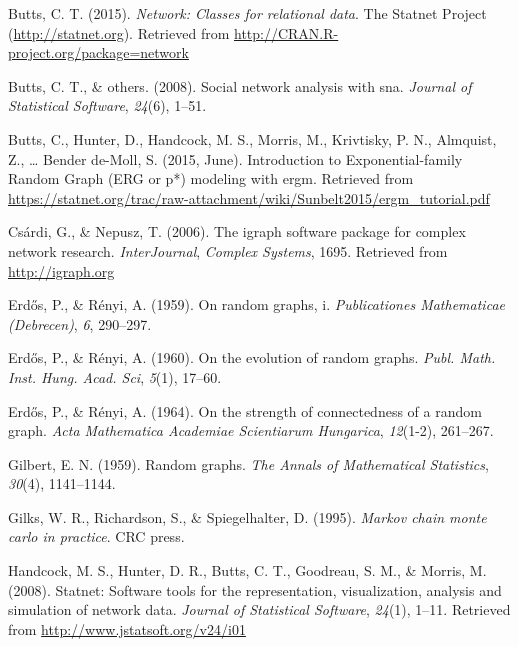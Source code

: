 \documentclass[12pt,twoside]{amherstthesis}
\begin{document}
  \hypertarget{ref-networkpackagemanual}{}
  Butts, C. T. (2015). \emph{Network: Classes for relational data}. The
  Statnet Project (\url{http://statnet.org}). Retrieved from
  \url{http://CRAN.R-project.org/package=network}
  
  \hypertarget{ref-butts2008social}{}
  Butts, C. T., \& others. (2008). Social network analysis with sna.
  \emph{Journal of Statistical Software}, \emph{24}(6), 1--51.
  
  \hypertarget{ref-butts_introduction_2015}{}
  Butts, C., Hunter, D., Handcock, M. S., Morris, M., Krivtisky, P. N.,
  Almquist, Z., \ldots{} Bender de-Moll, S. (2015, June). Introduction to
  Exponential-family Random Graph (ERG or p*) modeling with ergm.
  Retrieved from
  \url{https://statnet.org/trac/raw-attachment/wiki/Sunbelt2015/ergm_tutorial.pdf}
  
  \hypertarget{ref-igraphpackage}{}
  Csárdi, G., \& Nepusz, T. (2006). The igraph software package for
  complex network research. \emph{InterJournal}, \emph{Complex Systems},
  1695. Retrieved from \url{http://igraph.org}
  
  \hypertarget{ref-erdos1959random}{}
  Erd\H{o}s, P., \& Rényi, A. (1959). On random graphs, i.
  \emph{Publicationes Mathematicae (Debrecen)}, \emph{6}, 290--297.
  
  \hypertarget{ref-erdos1960evolution}{}
  Erd\H{o}s, P., \& Rényi, A. (1960). On the evolution of random graphs.
  \emph{Publ. Math. Inst. Hung. Acad. Sci}, \emph{5}(1), 17--60.
  
  \hypertarget{ref-erdHos1964strength}{}
  Erd\H{o}s, P., \& Rényi, A. (1964). On the strength of connectedness of
  a random graph. \emph{Acta Mathematica Academiae Scientiarum Hungarica},
  \emph{12}(1-2), 261--267.
  
  \hypertarget{ref-gilbert1959random}{}
  Gilbert, E. N. (1959). Random graphs. \emph{The Annals of Mathematical
  Statistics}, \emph{30}(4), 1141--1144.
  
  \hypertarget{ref-gilks1995markov}{}
  Gilks, W. R., Richardson, S., \& Spiegelhalter, D. (1995). \emph{Markov
  chain monte carlo in practice}. CRC press.
  
  \hypertarget{ref-statnetpackagearticle}{}
  Handcock, M. S., Hunter, D. R., Butts, C. T., Goodreau, S. M., \&
  Morris, M. (2008). Statnet: Software tools for the representation,
  visualization, analysis and simulation of network data. \emph{Journal of
  Statistical Software}, \emph{24}(1), 1--11. Retrieved from
  \url{http://www.jstatsoft.org/v24/i01}
  
\end{document}
